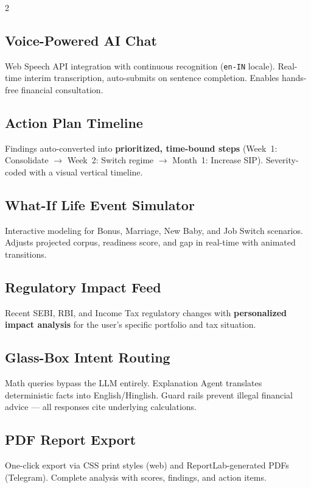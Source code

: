 \documentclass[9pt,a4paper]{article}
\begin{document}
\begin{multicols}{2}
\small

\subsection{Voice-Powered AI Chat}
Web Speech API integration with continuous recognition (\texttt{en-IN} locale). Real-time interim transcription, auto-submits on sentence completion. Enables hands-free financial consultation.

\subsection{Action Plan Timeline}
Findings auto-converted into \textbf{prioritized, time-bound steps} (Week~1: Consolidate $\rightarrow$ Week~2: Switch regime $\rightarrow$ Month~1: Increase SIP). Severity-coded with a visual vertical timeline.

\subsection{What-If Life Event Simulator}
Interactive modeling for Bonus, Marriage, New Baby, and Job Switch scenarios. Adjusts projected corpus, readiness score, and gap in real-time with animated transitions.

\subsection{Regulatory Impact Feed}
Recent SEBI, RBI, and Income Tax regulatory changes with \textbf{personalized impact analysis} for the user's specific portfolio and tax situation.

\subsection{Glass-Box Intent Routing}
Math queries bypass the LLM entirely. Explanation Agent translates deterministic facts into English/Hinglish. Guard rails prevent illegal financial advice --- all responses cite underlying calculations.

\subsection{PDF Report Export}
One-click export via CSS print styles (web) and ReportLab-generated PDFs (Telegram). Complete analysis with scores, findings, and action items.

\end{multicols}
\end{document}
